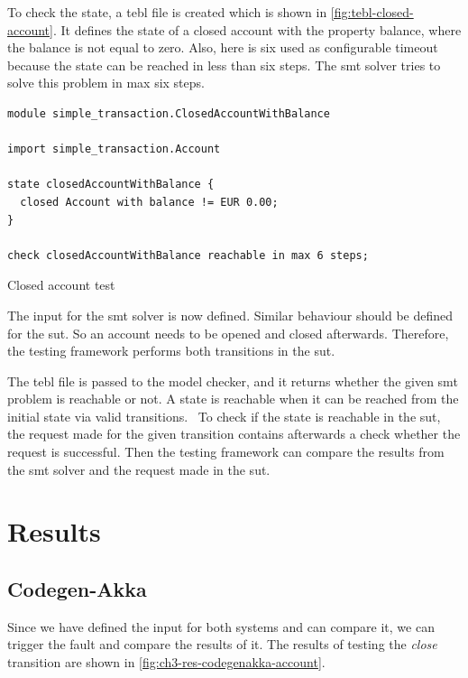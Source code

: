 To check the state, a tebl file is created which is shown in
\autoref{fig:tebl-closed-account}. It defines the state of a closed account with
the property balance, where the balance is not equal to zero. Also, here is six
used as configurable timeout because the state can be reached in less than six
steps. The \gls{smt} solver tries to solve this problem in max six steps.

\begin{sourcecode}[h!]
\begin{lstlisting}[]
module simple_transaction.ClosedAccountWithBalance

import simple_transaction.Account

state closedAccountWithBalance {
  closed Account with balance != EUR 0.00;
}

check closedAccountWithBalance reachable in max 6 steps;
\end{lstlisting}
\caption{Closed account test}\label{fig:tebl-closed-account}
\end{sourcecode}
\FloatBarrier

The input for the \gls{smt} solver is now defined. Similar behaviour should be defined
for the \gls{sut}. So an account needs to be opened and closed
afterwards. Therefore, the testing framework performs both transitions in the
\gls{sut}.

The tebl file is passed to the model checker, and it returns whether the given
\gls{smt} problem is reachable or not. A state is reachable when it can be reached
from the initial state via valid
transitions.~\cite[p.~4]{stoel_storm_vinju_bosman_2016} To check if the state is
reachable in the \gls{sut}, the request made for the given transition
contains afterwards a check whether the request is successful. Then the testing
framework can compare the results from the \gls{smt} solver and the request made in
the \gls{sut}.

\section{Results}

\subsection{Codegen-Akka}

Since we have defined the input for both systems and can compare it, we
can trigger the fault and compare the results of it. The results of testing the
\textit{close} transition are shown in \autoref{fig:ch3-res-codegenakka-account}.

